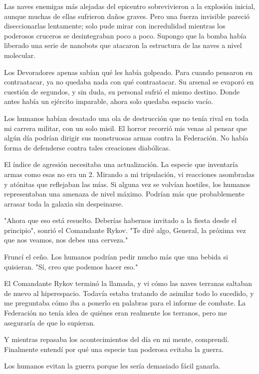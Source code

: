 \documentclass[spanish,12pt,a4paper,oneside,titlepage]{book}
\begin{document}
    Las naves enemigas más alejadas del epicentro sobrevivieron a la explosión inicial, aunque muchas de ellas sufrieron daños graves. Pero una fuerza invisible pareció diseccionarlas lentamente; solo pude mirar con incredulidad mientras los poderosos cruceros se desintegraban poco a poco. Supongo que la bomba había liberado una serie de nanobots que atacaron la estructura de las naves a nivel molecular.

    Los Devoradores apenas sabían qué les había golpeado. Para cuando pensaron en contraatacar, ya no quedaba nada con qué contraatacar. Su arsenal se evaporó en cuestión de segundos, y sin duda, su personal sufrió el mismo destino. Donde antes había un ejército imparable, ahora solo quedaba espacio vacío.

    Los humanos habían desatado una ola de destrucción que no tenía rival en toda mi carrera militar, con un solo misil. El horror recorrió mis venas al pensar que algún día podrían dirigir sus monstruosas armas contra la Federación. No había forma de defenderse contra tales creaciones diabólicas.

    El índice de agresión necesitaba una actualización. La especie que inventaría armas como esas no era un 2. Mirando a mi tripulación, vi reacciones asombradas y atónitas que reflejaban las mías. Si alguna vez se volvían hostiles, los humanos representaban una amenaza de nivel máximo. Podrían más que probablemente arrasar toda la galaxia sin despeinarse.

    "Ahora que eso está resuelto. Deberías habernos invitado a la fiesta desde el principio", sonrió el Comandante Rykov. "Te diré algo, General, la próxima vez que nos veamos, nos debes una cerveza."

    Fruncí el ceño. Los humanos podrían pedir mucho más que una bebida si quisieran. "Sí, creo que podemos hacer eso."

    El Comandante Rykov terminó la llamada, y vi cómo las naves terranas saltaban de nuevo al hiperespacio. Todavía estaba tratando de asimilar todo lo sucedido, y me preguntaba cómo iba a ponerlo en palabras para el informe de combate. La Federación no tenía idea de quiénes eran realmente los terranos, pero me aseguraría de que lo supieran.

    Y mientras repasaba los acontecimientos del día en mi mente, comprendí. Finalmente entendí por qué una especie tan poderosa evitaba la guerra.

    Los humanos evitan la guerra porque les sería demasiado fácil ganarla.
\end{document}
